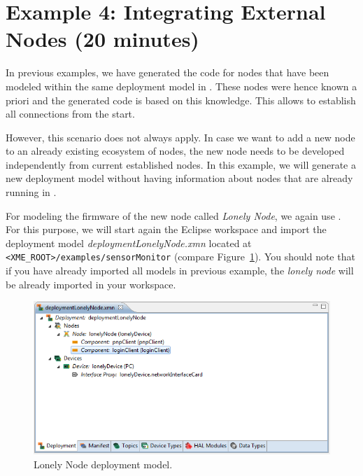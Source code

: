 %
% 
%
%
%

\section{Example 4: Integrating External Nodes (20 minutes)}
\label{sec:example_lonelyNode}

In previous examples, we have generated the code for nodes that have been modeled within the same deployment model in \xmt.
These nodes were hence known a priori and the generated code is based on this knowledge.
This allows to establish all connections from the start.

However, this scenario does not always apply.
In case we want to add a new node to an already existing ecosystem of nodes,
the new node needs to be developed independently from current established nodes.
%
In this example, we will generate a new deployment model without having information about nodes that are already running in \xme.

For modeling the firmware of the new node called \emph{Lonely Node}, we again use \xmt.
For this purpose, we will start again the Eclipse workspace and import the deployment model
\emph{deploymentLonelyNode.xmn} located at \verb|<XME_ROOT>/examples/sensorMonitor| (compare Figure~\ref{fig:xmt_deploymentLonely}).
%
You should note that if you have already imported all models in previous example,
the \emph{lonely node} will be already imported in your workspace.

\begin{figure}[htpb]
	\centering
	\includegraphics[scale=0.5]{figures/xmt_deploymentLonely.png}
	\caption{Lonely Node deployment model.}
	\label{fig:xmt_deploymentLonely}
\end{figure}

